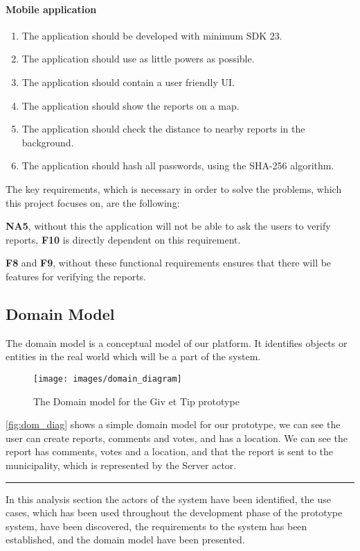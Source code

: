 \paragraph{Mobile application}
\begin{enumerate}[label=NA\arabic*]
\item The application should be developed with minimum SDK 23.
\item The application should use as little powers as possible.
\item The application should contain a user friendly UI.
\item The application should show the reports on a map.
\item The application should check the distance to nearby reports in the background.
\item The application should hash all passwords, using the SHA-256 algorithm.
\end{enumerate}


The key requirements, which is necessary in order to solve the problems, which this project focuses on, are the following:

\textbf{NA5}, without this the application will not be able to ask the users to verify reports, \textbf{F10} is directly dependent on this requirement.

\textbf{F8} and \textbf{F9}, without these functional requirements ensures that there will be features for verifying the reports.


\subsection{Domain Model} \label{sec:domain_model}
The domain model is a conceptual model of our platform. It identifies objects or entities in the real world which will be a part of the system.

\begin{figure}[hbt]
\centering
\texttt{[image: images/domain\_diagram]}
\caption{The Domain model for the Giv et Tip prototype} \label{fig:dom_diag}
\end{figure}


\autoref{fig:dom_diag} shows a simple domain model for our prototype, we can see the user can create reports, comments and votes, and has a location. We can see the report has comments, votes and a location, and that the report is sent to the municipality, which is represented by the Server actor.

\vspace{3em}
\hrule
In this analysis section the actors of the system have been identified, the use cases, which has been used throughout the development phase of the prototype system, have been discovered, the requirements to the system has been established, and the domain model have been presented.
